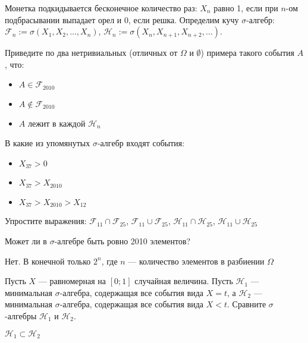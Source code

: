 \begin{problem}
Монетка подкидывается бесконечное количество раз: $X_{n}$ равно 1, если при $ n $-ом подбрасывании выпадает орел и 0, если решка. Определим кучу $ \sigma $-алгебр: $\mathcal{F}_{n}:=\sigma(X_{1},X_{2},\ldots,X_{n})$, $\mathcal{H}_{n}:=\sigma(X_{n},X_{n+1},X_{n+2},\ldots)$.

Приведите по два нетривиальных (отличных от $\Omega$ и $\emptyset$) примера такого события $A$, что:

\begin{itemize}
\item $ A\in \mathcal{F}_{2010} $
\item $ A\notin \mathcal{F}_{2010} $
\item $A$ лежит в каждой $\mathcal{H}_{n}$
\end{itemize}

В какие из упомянутых $ \sigma $-алгебр входят события:
\begin{itemize}
\item $ X_{37}>0$
\item $ X_{37}>X_{2010}$
\item $ X_{37}>X_{2010}>X_{12}$
\end{itemize}

Упростите выражения: $ \mathcal{F}_{11}\cap \mathcal{F}_{25} $, $ \mathcal{F}_{11}\cup \mathcal{F}_{25} $, $ \mathcal{H}_{11}\cap \mathcal{H}_{25} $, $ \mathcal{H}_{11}\cup \mathcal{H}_{25} $

\begin{sol}

\end{sol}
\end{problem}

\begin{problem}
Может ли в $ \sigma $-алгебре быть ровно 2010 элементов?

\begin{sol}
Нет. В конечной только $2^n$, где $n$ — количество элементов в разбиении $\Omega$
\end{sol}
\end{problem}

\begin{problem}
Пусть $X$ — равномерная на $ [0;1] $ случайная величина. Пусть $ \mathcal{H}_{1} $ — минимальная $ \sigma $-алгебра, содержащая все события вида $ X=t $, а $ \mathcal{H}_{2} $ — минимальная $ \sigma $-алгебра, содержащая все события вида $X<t$. Сравните $\sigma$-алгебры $ \mathcal{H}_{1} $ и $ \mathcal{H}_{2} $.

\begin{sol}
$ \mathcal{H}_{1} \subset \mathcal{H}_{2} $
\end{sol}
\end{problem}

